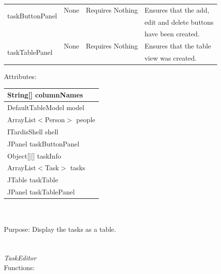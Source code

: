 \begin{tabular}{| l | l | l | l |}
\hline
\multirow{2}{*}{taskButtonPanel} & None & Requires Nothing & Ensures that the add,\\
		 	                    &          &                             & edit and delete buttons\\
                                                        &          &                             & have been created.
\\
\hline
\multirow{2}{*}{taskTablePanel} & None & Requires Nothing & Ensures that the table\\
		 	                 &           &                             & view was created.
\\
\hline
\end{tabular}

Attributes:\\
\begin{tabular}{| l |}
\hline
String[] columnNames\\
\hline
DefaultTableModel model\\
\hline
ArrayList$<$Person$>$ people\\
\hline
ITardisShell shell\\
\hline
JPanel taskButtonPanel\\
\hline
Object[][] taskInfo\\
\hline
ArrayList$<$Task$>$ tasks\\
\hline
JTable taskTable\\
\hline
JPanel taskTablePanel\\
\hline
\end{tabular}\\
\\
Purpose: Display the tasks as a table.\\
\\
\\
\emph{TaskEditor}\\
Functions:\\
